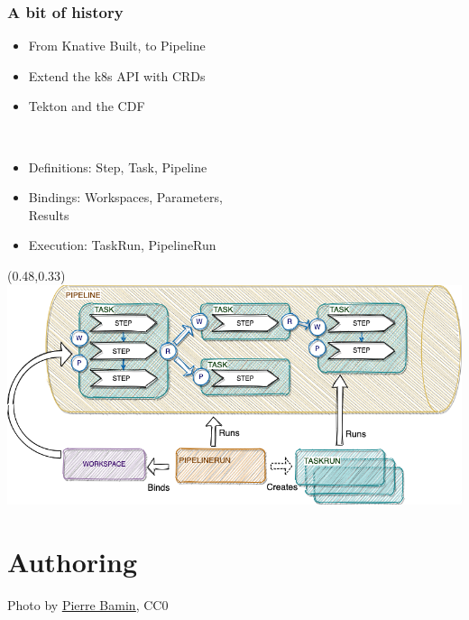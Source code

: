 \documentclass[aspectratio=169,11pt,hyperref={colorlinks=true}]{beamer}
\begin{document}
\begin{lgrayrwhiteframe}
  \frametitle{A bit of history}
  \begin{itemize}
    \item From Knative Built, to Pipeline
    \item Extend the k8s API with CRDs
    \item Tekton and the CDF
  \end{itemize}
  \vspace{0.03\paperheight}
  ~~~~~
  \vspace{0.03\paperheight}
  \begin{itemize}
    \item Definitions: Step, Task, Pipeline
    \item Bindings: Workspaces, Parameters, \\Results
    \item Execution: TaskRun, PipelineRun
  \end{itemize}
  \begin{textblock*}{0.51\paperwidth}(0.48\paperwidth,0.33\paperheight)
    \includegraphics[width=0.5\paperwidth]{img/tekton-workspaces.png}
  \end{textblock*}
\end{lgrayrwhiteframe}


\section[Authoring]{Authoring}

\begin{sectionwithpicrx}{Photo by \href{https://unsplash.com/@bamin}{\underline{Pierre Bamin}}, CC0}
\end{sectionwithpicrx}
\end{document}
